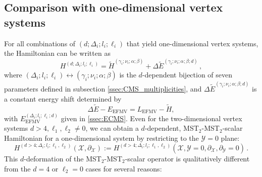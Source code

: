 \documentclass{article}
\def \Dg {\Delta}
\def \ds {\partial}
\def \ag {\alpha}
\def \bg {\beta}
\def \cg {\gamma}
\begin{document}
\subsection{Comparison with one-dimensional vertex systems}
For all combinations of $(d;\Dg_i;l_i;\ell_i)$ that yield one-dimensional vertex systems, the Hamiltonian can be written as 
\begin{equation}
    H^{(d;\Dg_i;l_i;\ell_i)} = \tilde{H}^{(\cg_i;\nu_i;\ag;\bg)} + \Delta \tilde{E}^{(\cg_i;\nu_i;\ag;\bg;d)}\,, 
    \label{tildeH}
\end{equation}
where $(\Dg_i;l_i;\ell_i) \leftrightarrow (\cg_i;\nu_i;\ag;\bg)$ is the $d$-dependent bijection of seven parameters defined in subsection \ref{ssec:CMS_multiplicities}, and $\Delta \tilde{E}^{(\cg_i;\nu_i;\ag;\bg;d)}$ is a constant energy shift determined by 
\begin{equation}
    \Delta \tilde{E} - E_{\mathrm{EFMV}} =L_{\mathrm{EFMV}}-\tilde{H},
\end{equation}
with $E_{\mathrm{EFMV}}^{(\Dg_i;l_i;\ell_i;d)}$ given in \ref{ssec:ECMS}. Even for the two-dimensional vertex systems $d>4,\ell_1,\ell_2\neq 0$, we can obtain a $d$-dependent, MST$_2$-MST$_2$-scalar Hamiltonian for a one-dimensional system by restricting to the $\mathcal{Y}=0$ plane:
\begin{equation}
    H^{(d>4;\Dg_i;l_i;\ell_1,\ell_2)}(\mathcal{X},\ds_{\mathcal{X}}) := H^{(d>4;\Dg_i;l_i;\ell_1,\ell_2)}(\mathcal{X},\mathcal{Y}=0,\ds_{\mathcal{X}},\ds_\mathcal{Y}=0)\,.
\end{equation}
This $d$-deformation of the  MST$_2$-MST$_2$-scalar  operator is qualitatively different from the $d=4$ or $\ell_2=0$ cases for several reasons:
\end{document}
